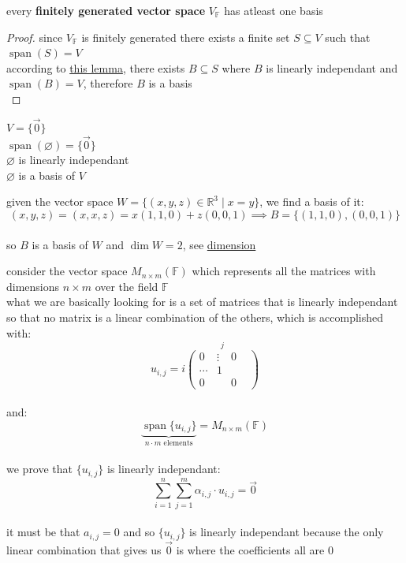 \documentclass[a4paper,12pt]{article}
\DeclareMathOperator{\spn}{span}
\begin{document}
\begin{definition}
\begin{lemma}
every \textbf{finitely generated vector space} \(V_\mathbb{F}\) has atleast one basis\\
\begin{proof}
since \(V_\mathbb{F}\) is finitely generated there exists a finite set \(S \subseteq V\) such that \(\spn(S) = V\)\\
according to \hyperref[orgd3163b2]{this lemma}, there exists \(B \subseteq S\) where \(B\) is linearly independant and \(\spn(B) = V\), therefore \(B\) is a basis\\
\end{proof}
\end{lemma}
\begin{my_example}
\(V = \{\vec0\}\)\\
\(\spn(\varnothing) = \{\vec0\}\)\\
\(\varnothing\) is linearly independant\\
\(\varnothing\) is a basis of \(V\)\\
\end{my_example}
\begin{my_example}
given the vector space \(W = \{(x,y,z)\in\mathbb{R}^3 \mid x=y\}\), we find a basis of it:\\
\[
(x,y,z) = (x,x,z) = x(1,1,0) + z(0,0,1) \implies B = \{(1,1,0),(0,0,1)\}
\]\\
so \(B\) is a basis of \(W\) and \(\dim W = 2\), see \hyperref[sec:orgdef24d1]{dimension}\\
\end{my_example}
\begin{my_example}
consider the vector space \(M_{n \times m}(\mathbb{F})\) which represents all the matrices with dimensions \(n \times m\) over the field \(\mathbb{F}\)\\
what we are basically looking for is a set of matrices that is linearly independant so that no matrix is a linear combination of the others, which is accomplished with:\\
\[
  u_{i,j} = i\stackrel{j}{\begin{pmatrix} 0 & \vdots & 0\\ \cdots & 1 & &\\ 0 & & 0 \end{pmatrix}}
\]\\
and:\\
\[
  \underbrace{\spn\{u_{i,j}\}}_{n \cdot m \text{ elements}} = M_{n \times m}(\mathbb{F})
\]\\
we prove that \(\{u_{i,j}\}\) is linearly independant:\\
\[
  \sum_{i=1}^{n} \sum_{j=1}^{m} \alpha_{i,j} \cdot u_{i,j} = \vec0
\]\\
it must be that \(a_{i,j} = 0\) and so \(\{u_{i,j}\}\) is linearly independant because the only linear combination that gives us \(\vec0\) is where the coefficients all are 0\\
\end{my_example}


\end{definition}
\end{document}
